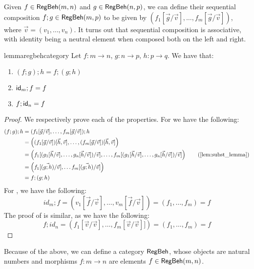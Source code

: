 	Given $f \in \mathsf{RegBeh}(m,n)$ and $g \in \mathsf{RegBeh}(n,p)$, we can define their sequential composition $f;g \in \mathsf{RegBeh}(m,p)$ to be given by $(f_1[\vec{g} / \vec{v}], \dots, f_m[\vec{g}/ \vec{v}])$, where $\vec{v}=(v_1, \dots, v_n)$. It turns out that sequential composition is associative, with identity being a neutral element when composed both on the left and right.
 \begin{restatable}{lemma}{regbehcategory}\label{lem:comp_associative}
	Let $f \colon m \to n$, $g \colon n \to p$, $h \colon p \to q$. We have that: 
	\begin{enumerate}
		\item $(f;g);h = f;(g;h)$
		\item $\mathsf{id}_m ; f = f$
		\item $f ; \mathsf{id}_n = f$
	\end{enumerate}	
\end{restatable}
\begin{proof}
	We respectively prove each of the properties. For  we have the following:
	\begin{align*}
			(f ; g) ; h &= (f_1[\vec{g}/\vec{v}], \dots, f_m[\vec{g}/\vec{v}]);h \\
			&= \left((f_1[\vec{g}/\vec{v}])[\vec{h}, \vec{v}], \dots, (f_m[\vec{g}/\vec{v}])[\vec{h}, \vec{v}]\right)\\
			&= \left(f_1[(g_1[\vec{h}/\vec{v}], \dots, g_n[\vec{h}/\vec{v}])/\vec{v}],\dots, f_m[(g_1[\vec{h}/\vec{v}], \dots, g_n[\vec{h}/\vec{v}])/\vec{v}]\right) \tag{\Cref{lem:subst_lemma}} \\
			&= \left(f_1 [\vec{(g;h)}/\vec{v}], \dots f_m [\vec{(g;h)}/\vec{v}] \right) \\
			&= f ; (g;h)
		\end{align*}
	For , we have the following:
	$$id_m ; f = (v_1[\vec{f}/\vec{v}], \dots, v_m[\vec{f}/\vec{v}])=(f_1, \dots, f_m) = f$$
	The proof of  is similar, as we have the following: $$f ; id_n = (f_1[\vec{v}/\vec{v}], \dots, f_m[\vec{v}/\vec{v}]]) = (f_1, \dots, f_m) = f$$
\end{proof}

Because of the above, we can define a category $\mathsf{RegBeh}$, whose objects are natural numbers and morphisms $f \colon m \to n$ are elements $f \in \mathsf{RegBeh}(m,n)$. 

